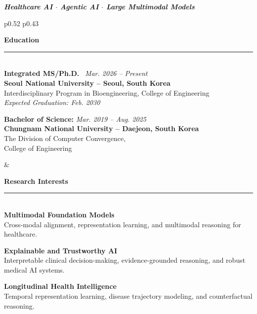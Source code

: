 \documentclass{resume}
\begin{document}
{\centerline {\em \textbf { Healthcare AI $\cdot$ Agentic AI $\cdot$ Large Multimodal Models } } }

\begin{table}[h!]
\begin{tabular}{p{0.52\textwidth} p{0.43\textwidth}}
\begin{minipage}[t]{\linewidth}
    \vspace{0pt}
    {\Large \textbf{Education}} \\
    \rule{\linewidth}{0.3pt}\\[4pt]

    \textbf{Integrated MS/Ph.D.} \textbar\ \textit{Mar. 2026 -- Present} \\
    \textbf{Seoul National University -- Seoul, South Korea}\\
    Interdisciplinary Program in Bioengineering, College of Engineering \\
    \textit{Expected Graduation: Feb. 2030}
    
    \bigskip
    \textbf{Bachelor of Science:} \textit{Mar. 2019 -- Aug. 2025} \\
    \textbf{Chungnam National University -- Daejeon, South Korea}\\
    The Division of Computer Convergence, \\ College of Engineering
\end{minipage}
&
\begin{minipage}[t]{\linewidth}
    \vspace{0pt}
    {\Large \textbf{Research Interests}} \\
    \rule{\linewidth}{0.3pt}\\[2pt]

    \textbf{Multimodal Foundation Models} \\
    Cross-modal alignment, representation learning, and multimodal reasoning for healthcare.

    \vspace{3pt}
    \textbf{Explainable and Trustworthy AI} \\
    Interpretable clinical decision-making, evidence-grounded reasoning, and robust medical AI systems.

    \vspace{3pt}
    \textbf{Longitudinal Health Intelligence} \\
    Temporal representation learning, disease trajectory modeling, and counterfactual reasoning.
\end{minipage}
\end{tabular}
\end{table}
\end{document}
